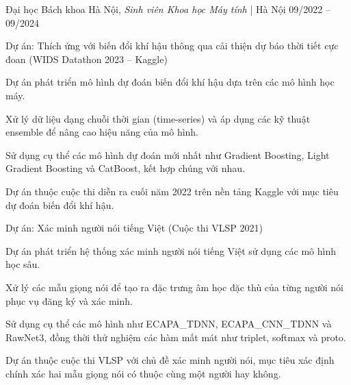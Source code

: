 \vspace{8pt}

\begin{cventries2}

  \cventrynew
  {Đại học Bách khoa Hà Nội, \textnormal{\textit{Sinh viên Khoa học Máy tính} | Hà Nội}}
  {09/2022 -- 09/2024}
  {}

\end{cventries2}

\vspace{-10pt}

\begin{cventries}

  \cventry
    {Dự án: Thích ứng với biến đổi khí hậu thông qua cải thiện dự báo thời tiết cực đoan (WIDS Datathon 2023 -- Kaggle)}
    {}
    {
      \begin{cvitems}
        \item {Dự án phát triển mô hình dự đoán biến đổi khí hậu dựa trên các mô hình học máy.}
        \item {Xử lý dữ liệu dạng chuỗi thời gian (time-series) và áp dụng các kỹ thuật ensemble để nâng cao hiệu năng của mô hình.}
        \item {Sử dụng cụ thể các mô hình dự đoán mới nhất như Gradient Boosting, Light Gradient Boosting và CatBoost, kết hợp chúng với nhau.}
        \item {Dự án thuộc cuộc thi diễn ra cuối năm 2022 trên nền tảng Kaggle với mục tiêu dự đoán biến đổi khí hậu.}
      \end{cvitems}
    }

\vspace{8pt}

  \cventry
    {Dự án: Xác minh người nói tiếng Việt (Cuộc thi VLSP 2021)}
    {}
    {
      \begin{cvitems}
        \item {Dự án phát triển hệ thống xác minh người nói tiếng Việt sử dụng các mô hình học sâu.}
        \item {Xử lý các mẫu giọng nói để tạo ra đặc trưng âm học đặc thù của từng người nói phục vụ đăng ký và xác minh.}
        \item {Sử dụng cụ thể các mô hình như ECAPA\_TDNN, ECAPA\_CNN\_TDNN và RawNet3, đồng thời thử nghiệm các hàm mất mát như triplet, softmax và proto.}
        \item {Dự án thuộc cuộc thi VLSP với chủ đề xác minh người nói, mục tiêu xác định chính xác hai mẫu giọng nói có thuộc cùng một người hay không.}
      \end{cvitems}
    }


\end{cventries}
